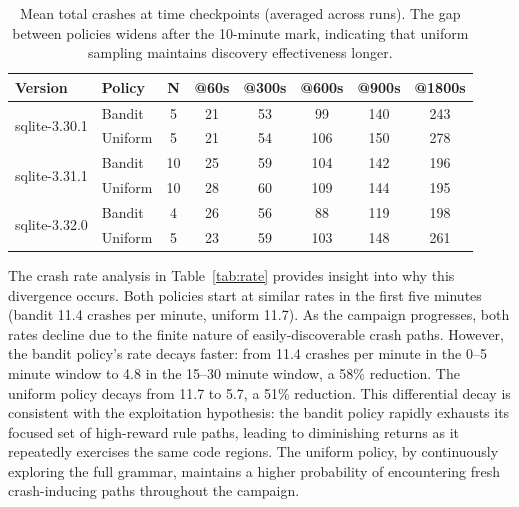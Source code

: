 \begin{table}[htbp]
\caption{Mean total crashes at time checkpoints (averaged across runs). The gap between policies widens after the 10-minute mark, indicating that uniform sampling maintains discovery effectiveness longer.}
\label{tab:accumulation}
\centering
\begin{tabular}{llcccccc}
\toprule
\textbf{Version} & \textbf{Policy} & \textbf{N} & \textbf{@60s} & \textbf{@300s} & \textbf{@600s} & \textbf{@900s} & \textbf{@1800s} \\
\midrule
\multirow{2}{*}{sqlite-3.30.1} & Bandit & 5 & 21 & 53 & 99 & 140 & 243 \\
                                & Uniform & 5 & 21 & 54 & 106 & 150 & 278 \\
\midrule
\multirow{2}{*}{sqlite-3.31.1} & Bandit & 10 & 25 & 59 & 104 & 142 & 196 \\
                                & Uniform & 10 & 28 & 60 & 109 & 144 & 195 \\
\midrule
\multirow{2}{*}{sqlite-3.32.0} & Bandit & 4 & 26 & 56 & 88 & 119 & 198 \\
                                & Uniform & 5 & 23 & 59 & 103 & 148 & 261 \\
\bottomrule
\end{tabular}
\end{table}

The crash rate analysis in Table~\ref{tab:rate} provides insight into why this divergence occurs. Both policies start at similar rates in the first five minutes (bandit 11.4 crashes per minute, uniform 11.7). As the campaign progresses, both rates decline due to the finite nature of easily-discoverable crash paths. However, the bandit policy's rate decays faster: from 11.4 crashes per minute in the 0--5 minute window to 4.8 in the 15--30 minute window, a 58\% reduction. The uniform policy decays from 11.7 to 5.7, a 51\% reduction. This differential decay is consistent with the exploitation hypothesis: the bandit policy rapidly exhausts its focused set of high-reward rule paths, leading to diminishing returns as it repeatedly exercises the same code regions. The uniform policy, by continuously exploring the full grammar, maintains a higher probability of encountering fresh crash-inducing paths throughout the campaign.

